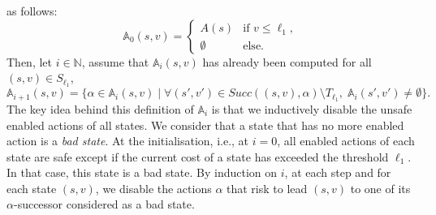 as follows:
\begin{equation}
  \mathbb{A}_0(s, v) = \begin{cases}
    A(s) & \text{if }v \leq \ell_1,\\
    \emptyset & \text{else}.
  \end{cases} \label{attractor-set-init}
\end{equation}
Then, let $i \in \mathbb{N}$, assume that $\mathbb{A}_i(s, v)$ has already been computed for all $(s, v) \in S_{\ell_1}$,
\begin{equation}
  \mathbb{A}_{i+1}(s, v) = \{ \alpha \in \mathbb{A}_i(s, v) \; | \;
    \forall (s', v') \in Succ( (s, v), \alpha ) \setminus T_{\ell_1}, \; \mathbb{A}_i(s', v') \neq \emptyset \}.
    \label{attractor-set}
\end{equation}
The key idea behind this definition of $\mathbb{A}_i$ is that we inductively disable the unsafe enabled actions of all states.
We consider that a state that has no more enabled action is a \textit{bad state}.
At the initialisation, i.e., at $i=0$, all enabled actions of each state are safe except if the current cost of a state has exceeded the threshold $\ell_1$. In that case, this state is a bad state.
By induction on $i$, at each step and for each state $(s, v)$,
we disable the actions $\alpha$
that risk to lead $(s, v)$ to one of its $\alpha$-successor considered as a bad state.%
